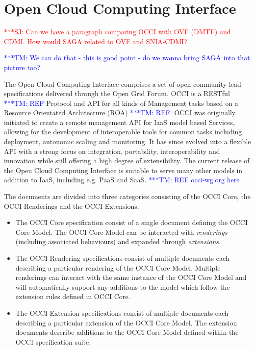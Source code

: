 \documentclass[10pt,conference,final,letterpaper,twoside,twocolumn,]{IEEEtran}
\newcommand{\jhanote}[1]{ {\textcolor{red}     {***SJ: #1}}}
\newcommand{\tmnote}[1]{  {\textcolor{blue}    {***TM: #1}}}
\newcommand{\jhanote}[1]{}
\newcommand{\tmnote}[1]{}
\begin{document}
\section{Open Cloud Computing Interface}
\label{sec:occi}

\jhanote{Can we have a paragraph comparing OCCI with OVF (DMTF) and
  CDMI. How would SAGA related to OVF and SNIA-CDMI?}

\tmnote{We can do that - this is good point - do we wanna bring SAGA into that picture too?}

The Open Cloud Computing Interface comprises a set of open
community-lead specifications delivered through the Open Grid
Forum. OCCI is a RESTful \tmnote{REF} Protocol and API for all kinds
of Management tasks based on a Resource Orientated Architecture (ROA)
\tmnote{REF}. OCCI was originally initiated to create a remote
management API for IaaS model based Services, allowing for the
development of interoperable tools for common tasks including
deployment, autonomic scaling and monitoring. It has since evolved
into a flexible API with a strong focus on integration, portability,
interoperability and innovation while still offering a high degree of
extensibility. The current release of the Open Cloud Computing
Interface is suitable to serve many other models in addition to IaaS,
including e.g. PaaS and SaaS. \tmnote{REF occi-wg.org here}

The documents are divided into three categories consisting of the OCCI
Core, the OCCI Renderings and the OCCI Extensions.
 
\begin{itemize}
  \item The OCCI Core specification consist of a single document
    defining the OCCI Core Model. The OCCI Core Model can be
    interacted with {\em renderings} (including associated behaviours)
    and expanded through {\em extensions}.
  \item The OCCI Rendering specifications consist of multiple
    documents each describing a particular rendering of the OCCI Core
    Model. Multiple renderings can interact with the same instance of
    the OCCI Core Model and will automatically support any additions
    to the model which follow the extension rules defined in OCCI
    Core.
  \item The OCCI Extension specifications consist of multiple
    documents each describing a particular extension of the OCCI Core
    Model. The extension documents describe additions to the OCCI Core
    Model defined within the OCCI specification suite.
\end{itemize}
\end{document}
